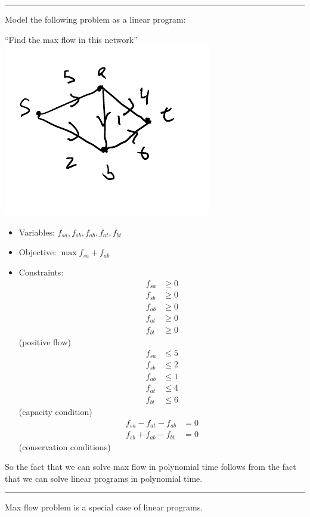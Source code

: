 \documentclass[12 pt]{article}
\begin{document}
         \noindent \rule{\textwidth}{0.5pt}
        Model the following problem as a linear program:

        ``Find the max flow in this network''
        \\ \includegraphics[width=.9\textwidth]{i96.pdf}
        \begin{itemize}
        \item Variables: $f_{sa}, f_{sb}, f_{ab}, f_{at}, f_{bt} $
        \item Objective: $\max f_{sa} + f_{ab}$
        \item Constraints:
          \begin{align*}
            f_{sa} & \geq 0
            \\ f_{sb} & \geq 0
            \\ f_{ab} & \geq 0
            \\ f_{at} & \geq 0
            \\ f_{bt} & \geq 0
          \end{align*}
          (positive flow)
          \begin{align*}
            f_{sa} & \leq 5
            \\ f_{sb} & \leq 2
            \\ f_{ab} & \leq 1
            \\ f_{at} & \leq 4
            \\ f_{bt} & \leq 6 
          \end{align*}
          (capacity condition)
          \begin{align*}
            f_{sa} - f_{at} - f_{ab} & = 0
            \\ f_{sb} + f_{ab} - f_{bt} & = 0
          \end{align*}
          (conservation conditions)
        \end{itemize}
        So the fact that we can solve max flow in polynomial time
        follows from the fact that we can solve linear programs in
        polynomial time.
        \\ \noindent \rule{\textwidth}{0.5pt}
        Max flow problem is a special case of linear programs.
      
\end{document}
